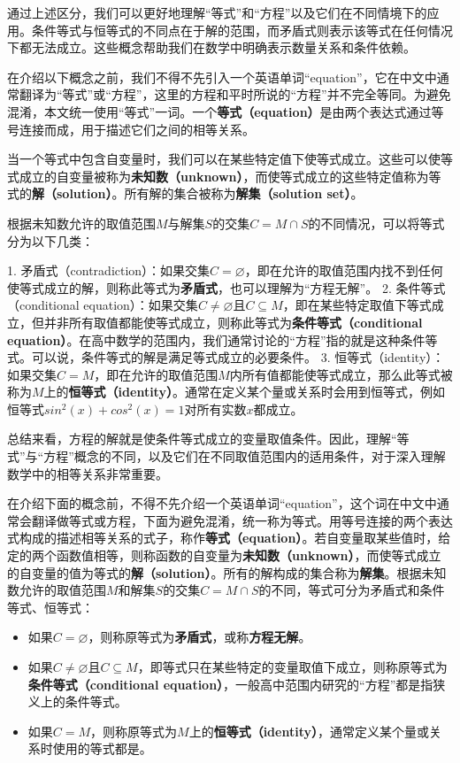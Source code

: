 通过上述区分，我们可以更好地理解“等式”和“方程”以及它们在不同情境下的应用。条件等式与恒等式的不同点在于解的范围，而矛盾式则表示该等式在任何情况下都无法成立。这些概念帮助我们在数学中明确表示数量关系和条件依赖。

在介绍以下概念之前，我们不得不先引入一个英语单词“equation”，它在中文中通常翻译为“等式”或“方程”，这里的方程和平时所说的“方程”并不完全等同。为避免混淆，本文统一使用“等式”一词。一个\textbf{等式（equation）}是由两个表达式通过等号连接而成，用于描述它们之间的相等关系。

当一个等式中包含自变量时，我们可以在某些特定值下使等式成立。这些可以使等式成立的自变量被称为\textbf{未知数（unknown）}，而使等式成立的这些特定值称为等式的\textbf{解（solution）}。所有解的集合被称为\textbf{解集（solution set）}。

根据未知数允许的取值范围$M$与解集$S$的交集$C=M\cap S$的不同情况，可以将等式分为以下几类：

	1.	矛盾式（contradiction）：如果交集$C=\varnothing$，即在允许的取值范围内找不到任何使等式成立的解，则称此等式为\textbf{矛盾式}，也可以理解为“方程无解”。
	2.	条件等式（conditional equation）：如果交集$C\neq\varnothing$且$C\subseteq M$，即在某些特定取值下等式成立，但并非所有取值都能使等式成立，则称此等式为\textbf{条件等式（conditional equation）}。在高中数学的范围内，我们通常讨论的“方程”指的就是这种条件等式。可以说，条件等式的解是满足等式成立的必要条件。
	3.	恒等式（identity）：如果交集$C=M$，即在允许的取值范围$M$内所有值都能使等式成立，那么此等式被称为$M$上的\textbf{恒等式（identity）}。通常在定义某个量或关系时会用到恒等式，例如恒等式$sin^2(x) + cos^2(x) = 1$对所有实数$x$都成立。

总结来看，方程的解就是使条件等式成立的变量取值条件。因此，理解“等式”与“方程”概念的不同，以及它们在不同取值范围内的适用条件，对于深入理解数学中的相等关系非常重要。


在介绍下面的概念前，不得不先介绍一个英语单词“equation”，这个词在中文中通常会翻译做等式或方程，下面为避免混淆，统一称为等式。用等号连接的两个表达式构成的描述相等关系的式子，称作\textbf{等式（equation）}。若自变量取某些值时，给定的两个函数值相等，则称函数的自变量为\textbf{未知数（unknown）}，而使等式成立的自变量的值为等式的\textbf{解（solution）}。所有的解构成的集合称为\textbf{解集}。根据未知数允许的取值范围$M$和解集$S$的交集$C=M\cap S$的不同，等式可分为矛盾式和条件等式、恒等式：
\begin{itemize}
\item 如果$C=\varnothing$，则称原等式为\textbf{矛盾式}，或称\textbf{方程无解}。
\item 如果$C\neq\varnothing$且$C\subseteq M$，即等式只在某些特定的变量取值下成立，则称原等式为\textbf{条件等式（conditional equation）}，一般高中范围内研究的“方程”都是指狭义上的条件等式。
\item 如果$C=M$，则称原等式为$M$上的\textbf{恒等式（identity）}，通常定义某个量或关系时使用的等式都是。
\end{itemize}


